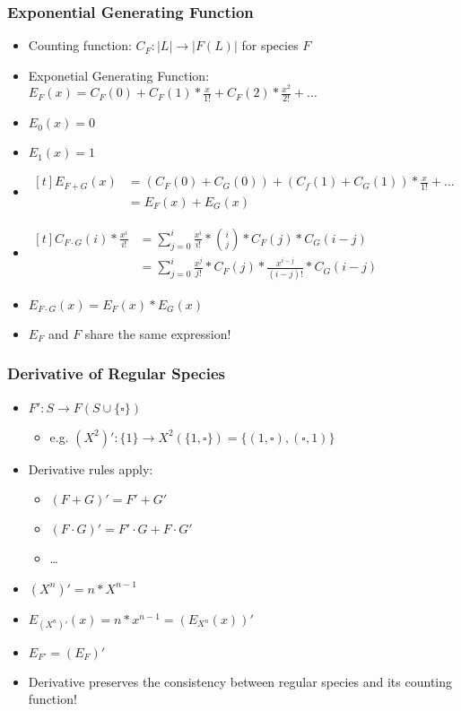 \begin{frame}
\frametitle{Exponential Generating Function}

\begin{itemize}
\item Counting function: $C_F: |L| \rightarrow |F(L)|$ for species $F$
\item Exponetial Generating Function: $E_F(x) = C_F(0) + C_F(1)*\frac{x}{1!} + C_F(2)*\frac{x^2}{2!} + \ldots$
\item $E_0(x) = 0$
\item $E_1(x) = 1$
\item
$\begin{aligned}[t]
E_{F+G}(x) &= (C_F(0)+C_G(0)) + (C_f(1)+C_G(1))*\frac{x}{1!} + \ldots\\
&= E_F(x) + E_G(x)
\end{aligned}$

\item $
\begin{aligned}[t]
C_{F\cdot G}(i)*\frac{x^i}{i!} 
&= \sum\limits_{j=0}^i \frac{x^i}{i!} * \binom{i}{j}*C_F(j)*C_G(i-j)\\
&= \sum\limits_{j=0}^i \frac{x^j}{j!}*C_F(j) * \frac{x^{i-j}}{(i-j)!}*C_G(i-j)
\end{aligned}$
\item $E_{F\cdot G}(x) = E_F(x) * E_G(x)$
\item $E_F$ and $F$ share the same expression!
\end{itemize}
\end{frame}

\begin{frame}
\frametitle{Derivative of Regular Species}

\begin{itemize}
\item $F': S \rightarrow F(S\cup\{\square\}) $
\begin{itemize}
\item e.g. $(X^2)': \{1\} \rightarrow X^2(\{1, \square\}) = \{(1,\square), (\square, 1)\}$
\end{itemize}

\item Derivative rules apply:
\begin{itemize}
\item $(F+G)'=F'+G'$
\item $(F\cdot G)' = F'\cdot G + F \cdot G'$
\item \dots
\end{itemize}

\item $(X^n)' = n * X^{n-1}$
\item $E_{(X^n)'}(x) = n * x^{n-1} = (E_{X^n}(x))'$
\item $E_{F'} = (E_F)'$
\item Derivative preserves the consistency between regular species and its counting function!
\end{itemize}
\end{frame}

